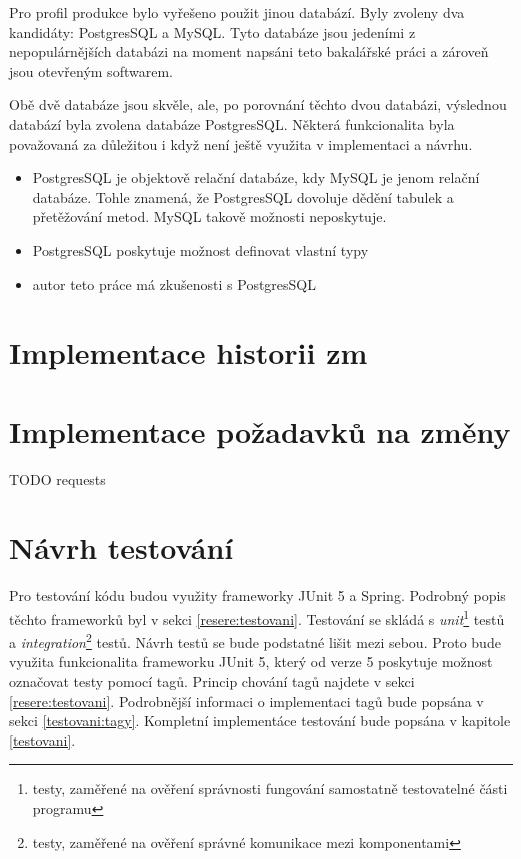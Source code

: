     Pro profil produkce bylo vyřešeno použit jinou databází. Byly zvoleny dva kandidáty: PostgresSQL a MySQL. Tyto databáze jsou jedeními z nepopulárnějších databázi na moment napsáni teto bakalářské práci a zároveň jsou otevřeným softwarem.
    
    Obě dvě databáze jsou skvěle, ale, po porovnání těchto dvou databázi, výslednou databází byla zvolena databáze PostgresSQL. Některá funkcionalita byla považovaná za důležitou i když není ještě využita v implementaci a návrhu.
    \begin{itemize}
            \item PostgresSQL je objektově relační databáze\cite{postgres-about}, kdy MySQL je jenom relační databáze\cite{mysql-wiki}. Tohle znamená, že PostgresSQL dovoluje dědění tabulek a přetěžování metod. MySQL takově možnosti neposkytuje.
            \item PostgresSQL poskytuje možnost definovat vlastní typy\cite{pstgres-create-type}
            \item autor teto práce má zkušenosti s PostgresSQL
    \end{itemize}
    
\section{Implementace historii zm}
    
    
\section{Implementace požadavků na změny}
    TODO requests
    
\section{Návrh testování}\label{navrh:testovani}
    Pro testování kódu budou využity frameworky JUnit 5 a Spring. Podrobný popis těchto frameworků byl v sekci \ref{resere:testovani}. Testování se skládá s \textit{unit}\footnote{testy, zaměřené na ověření správnosti fungování samostatně testovatelné části programu} testů a \textit{integration}\footnote{testy, zaměřené na ověření správné komunikace mezi komponentami} testů. Návrh testů se bude podstatné lišit mezi sebou. Proto bude využita funkcionalita frameworku JUnit 5, který od verze 5 poskytuje možnost označovat testy pomocí tagů\cite{junit-tags}. Princip chování tagů najdete v sekci \ref{resere:testovani}. Podrobnější informaci o implementaci tagů bude popsána v sekci \ref{testovani:tagy}. 
    Kompletní implementáce testování bude popsána v kapitole \ref{testovani}.
    
